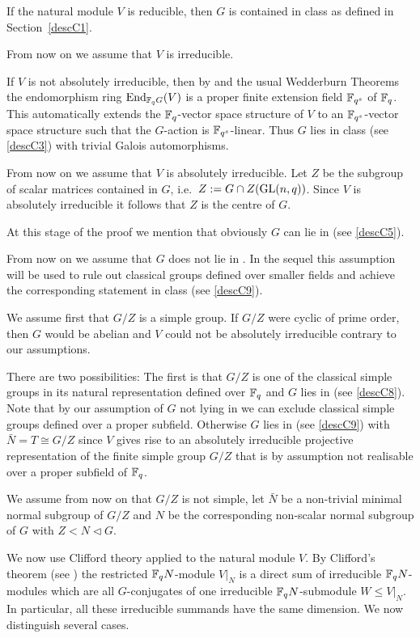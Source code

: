 If the natural module $V$ is reducible, then $G$ is contained in class 
as defined in Section~\ref{descC1}.

From now on we assume that $V$ is irreducible.

If $V$ is not absolutely irreducible, then by \cite[(29.13)]{CR0} and the 
usual Wedderburn Theorems
the endomorphism ring $\End_{\F_q G}(V)$ is a proper finite extension field
$\mathbb{F}_{q^s}$ of $\mathbb{F}_q$. This automatically extends the $\mathbb{F}_q$-vector
space structure of $V$ to an $\mathbb{F}_{q^s}$-vector space structure
such that the $G$-action is $\mathbb{F}_{q^s}$-linear. Thus $G$ lies in class
 (see \ref{descC3}) with trivial Galois automorphisms.

From now on we assume that $V$ is absolutely irreducible. Let $Z$ be the
subgroup of scalar matrices contained in $G$, i.e.~$Z := G \cap
Z(\GL(n,q))$. Since $V$ is absolutely irreducible it follows that $Z$ is
the centre of $G$.

At this stage of the proof we mention that obviously $G$ can lie
in  (see \ref{descC5}).

From now on we assume that $G$ does not lie in . In the sequel this 
assumption will be used to rule out classical groups defined over
smaller fields and achieve the corresponding statement in class 
(see \ref{descC9}).

We assume first that $G/Z$ is a simple group. If $G/Z$ were cyclic of prime 
order, then $G$ would be abelian and $V$ could not be absolutely
irreducible contrary to our assumptions.

There are two possibilities:
The first is that $G/Z$ is one of the
classical simple groups in its natural representation defined over $\mathbb{F}_q$
and $G$ lies in  (see
\ref{descC8}). Note that by our assumption of $G$ not lying in  we can
exclude classical simple groups defined over a proper subfield. Otherwise
$G$ lies in  (see \ref{descC9}) with
$\bar N =T \cong G/Z$ since $V$ gives rise to an absolutely irreducible
projective representation of the finite simple group $G/Z$ that
is by assumption not realisable over a proper subfield of $\mathbb{F}_q$.

We assume from now on that $G/Z$ is not simple, let $\bar N$
be a non-trivial minimal normal subgroup of $G/Z$ and $N$ be
the corresponding non-scalar normal subgroup of $G$ with $Z < N
\triangleleft G$.

We now use Clifford theory applied to the natural module $V$. By Clifford's
theorem (see \cite[(49.2) and (49.7)]{CR0}) the restricted $\mathbb{F}_q N$-module
$V|_N$ is a direct sum of irreducible $\mathbb{F}_q N$-modules which are all
$G$-conjugates of one irreducible $\mathbb{F}_q N$-submodule $W \le V|_N$. In
particular, all these irreducible summands have the same dimension. We now
distinguish several cases.

